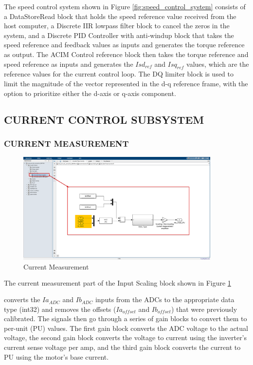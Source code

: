 The speed control system shown in Figure \ref{fig:speed_control_system} consists of a DataStoreRead block that holds the speed reference value received from the host computer, a Discrete IIR lowpass filter block to cancel the zeros in the system, and a Discrete PID Controller with anti-windup block that takes the speed reference and feedback values as inputs and generates the torque reference as output. The ACIM Control reference block then takes the torque reference and speed reference as inputs and generates the $Isd_{ref}$ and $Isq_{ref}$ values, which are the reference values for the current control loop. The DQ limiter block is used to limit the magnitude of the vector represented in the d-q reference frame, with the option to prioritize either the d-axis or q-axis component.


\subsection{CURRENT CONTROL SUBSYSTEM}

\subsubsection{CURRENT MEASUREMENT}


\begin{figure}[H]
	\centering
	\includegraphics[width=4in]{sections/section3/images/simulation/inputScaling/currentMeasurement.png}
	\caption{Current Measurement}
	\label{fig:current_measurement}
\end{figure}


The current measurement part of the Input Scaling block shown in Figure \ref{fig:current_measurement}

converts the $Ia_{ADC}$ and $Ib_{ADC}$ inputs from the ADCs to the appropriate data type (int32) and removes the offsets ($Ia_{offset}$ and $Ib_{offset}$) that were previously calibrated. The signals then go through a series of gain blocks to convert them to per-unit (PU) values. The first gain block converts the ADC voltage to the actual voltage, the second gain block converts the voltage to current using the inverter's current sense voltage per amp, and the third gain block converts the current to PU using the motor's base current.


